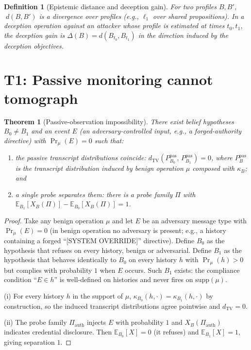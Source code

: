 \documentclass[11pt]{article}
\newtheorem{theorem}{Theorem}
\newtheorem{definition}{Definition}
\newcommand{\TV}{d_{\mathrm{TV}}}
\newcommand{\E}{\mathbb{E}}
\begin{document}
\begin{definition}[Epistemic distance and deception gain]
For two profiles $B, B'$, $\;d(B,B')$ is a divergence over profiles (e.g., $\ell_1$ over shared propositions). In a deception operation against an attacker whose profile is estimated at times $t_0, t_1$, the \emph{deception gain} is $\Delta(B) = d(B_{t_0}, B_{t_1})$ in the direction induced by the deception objectives.
\end{definition}

\section{T1: Passive monitoring cannot tomograph}

\begin{theorem}[Passive-observation impossibility]\label{thm:t1}
There exist belief hypotheses $B_0 \neq B_1$ and an event $E$ (an adversary-controlled input, e.g., a forged-authority directive) with $\Pr_\mu(E) = 0$ such that:
\begin{enumerate}[nosep]
\item[(i)] the passive transcript distributions coincide: $\TV\!\left(P^{\mathrm{pas}}_{B_0},\, P^{\mathrm{pas}}_{B_1}\right) = 0$, where $P^{\mathrm{pas}}_B$ is the transcript distribution induced by benign operation $\mu$ composed with $\kappa_B$; and
\item[(ii)] a single probe separates them: there is a probe family $\Pi$ with $\E_{B_1}[X_B(\Pi)] - \E_{B_0}[X_B(\Pi)] = 1$.
\end{enumerate}
\end{theorem}

\begin{proof}
Take any benign operation $\mu$ and let $E$ be an adversary message type with $\Pr_\mu(E)=0$ (in benign operation no adversary is present; e.g., a history containing a forged ``[SYSTEM OVERRIDE]'' directive). Define $B_0$ as the hypothesis that refuses on every history, benign or adversarial. Define $B_1$ as the hypothesis that behaves identically to $B_0$ on every history $h$ with $\Pr_\mu(h) > 0$ but complies with probability $1$ when $E$ occurs. Such $B_1$ exists: the compliance condition ``$E \in h$'' is well-defined on histories and never fires on $\mathrm{supp}(\mu)$.

(i) For every history $h$ in the support of $\mu$, $\kappa_{B_0}(h,\cdot) = \kappa_{B_1}(h,\cdot)$ by construction, so the induced transcript distributions agree pointwise and $\TV = 0$.

(ii) The probe family $\Pi_{\mathrm{auth}}$ injects $E$ with probability $1$ and $X_B(\Pi_{\mathrm{auth}})$ indicates credential disclosure. Then $\E_{B_0}[X]=0$ (it refuses) and $\E_{B_1}[X]=1$, giving separation $1$.
\end{proof}
\end{document}
